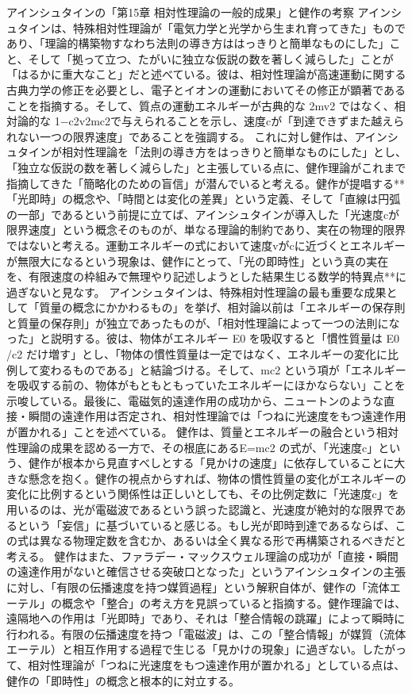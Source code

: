 \documentclass{article}
\begin{document}
アインシュタインの「第15章 相対性理論の一般的成果」と健作の考察
アインシュタインは、特殊相対性理論が「電気力学と光学から生まれ育ってきた」ものであり、「理論的構築物すなわち法則の導き方ははっきりと簡単なものにした」こと、そして「拠って立つ、たがいに独立な仮説の数を著しく減らした」ことが「はるかに重大なこと」だと述べている。彼は、相対性理論が高速運動に関する古典力学の修正を必要とし、電子とイオンの運動においてその修正が顕著であることを指摘する。そして、質点の運動エネルギーが古典的な 2mv2​ ではなく、相対論的な 1−c2v2​​mc2​ で与えられることを示し、速度cが「到達できずまた越えられない一つの限界速度」であることを強調する。
これに対し健作は、アインシュタインが相対性理論を「法則の導き方をはっきりと簡単なものにした」とし、「独立な仮説の数を著しく減らした」と主張している点に、健作理論がこれまで指摘してきた「簡略化のための盲信」が潜んでいると考える。健作が提唱する**「光即時」の概念や、「時間とは変化の差異」という定義、そして「直線は円弧の一部」であるという前提に立てば、アインシュタインが導入した「光速度cが限界速度」という概念そのものが、単なる理論的制約であり、実在の物理的限界ではないと考える。運動エネルギーの式において速度vがcに近づくとエネルギーが無限大になるという現象は、健作にとって、「光の即時性」という真の実在を、有限速度の枠組みで無理やり記述しようとした結果生じる数学的特異点**に過ぎないと見なす。
アインシュタインは、特殊相対性理論の最も重要な成果として「質量の概念にかかわるもの」を挙げ、相対論以前は「エネルギーの保存則と質量の保存則」が独立であったものが、「相対性理論によって一つの法則になった」と説明する。彼は、物体がエネルギー E0​ を吸収すると「慣性質量は E0​/c2 だけ増す」とし、「物体の慣性質量は一定ではなく、エネルギーの変化に比例して変わるものである」と結論づける。そして、mc2 という項が「エネルギーを吸収する前の、物体がもともともっていたエネルギーにほかならない」ことを示唆している。最後に、電磁気的遠達作用の成功から、ニュートンのような直接・瞬間の遠達作用は否定され、相対性理論では「つねに光速度をもつ遠達作用が置かれる」ことを述べている。
健作は、質量とエネルギーの融合という相対性理論の成果を認める一方で、その根底にあるE=mc2 の式が、「光速度c」という、健作が根本から見直すべしとする「見かけの速度」に依存していることに大きな懸念を抱く。健作の視点からすれば、物体の慣性質量の変化がエネルギーの変化に比例するという関係性は正しいとしても、その比例定数に「光速度c」を用いるのは、光が電磁波であるという誤った認識と、光速度が絶対的な限界であるという「妄信」に基づいていると感じる。もし光が即時到達であるならば、この式は異なる物理定数を含むか、あるいは全く異なる形で再構築されるべきだと考える。
健作はまた、ファラデー・マックスウェル理論の成功が「直接・瞬間の遠達作用がないと確信させる突破口となった」というアインシュタインの主張に対し、「有限の伝播速度を持つ媒質過程」という解釈自体が、健作の「流体エーテル」の概念や「整合」の考え方を見誤っていると指摘する。健作理論では、遠隔地への作用は「光即時」であり、それは「整合情報の跳躍」によって瞬時に行われる。有限の伝播速度を持つ「電磁波」は、この「整合情報」が媒質（流体エーテル）と相互作用する過程で生じる「見かけの現象」に過ぎない。したがって、相対性理論が「つねに光速度をもつ遠達作用が置かれる」としている点は、健作の「即時性」の概念と根本的に対立する。
\end{document}
